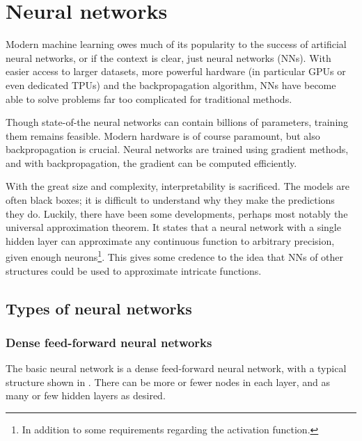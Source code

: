 \section{Neural networks}
Modern machine learning owes much of its popularity to the success of artificial neural networks, or if the context is clear, just neural networks (NNs).
With easier access to larger datasets, more powerful hardware (in particular GPUs or even dedicated TPUs) and the backpropagation algorithm, NNs have become able to solve problems far too complicated for traditional methods.

Though state-of-the neural networks can contain billions of parameters, training them remains feasible.
Modern hardware is of course paramount, but also backpropagation is crucial.
Neural networks are trained using gradient methods, and with backpropagation, the gradient can be computed efficiently.

With the great size and complexity, interpretability is sacrificed.
The models are often black boxes; it is difficult to understand why they make the predictions they do.
Luckily, there have been some developments, perhaps most notably the universal approximation theorem.
It states that a neural network with a single hidden layer can approximate any continuous function to arbitrary precision, given enough neurons\footnote{In addition to some requirements regarding the activation function.}.
This gives some credence to the idea that NNs of other structures could be used to approximate intricate functions.


\subsection{Types of neural networks}
\subsubsection{Dense feed-forward neural networks}
The basic neural network is a dense feed-forward neural network, with a typical structure shown in .
There can be more or fewer nodes in each layer, and as many or few hidden layers as desired.

